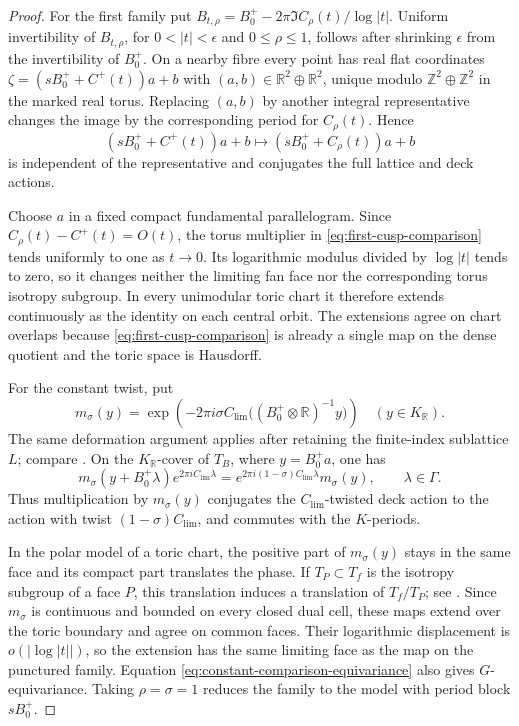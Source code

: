 \begin{proof}
For the first family put
$B_{t,\rho}=B_0^+-2\pi\Im C_\rho(t)/\log|t|$.
Uniform invertibility of $B_{t,\rho}$, for $0<|t|<\epsilon$ and
$0\leq\rho\leq1$, follows after shrinking $\epsilon$ from the
invertibility of $B_0^+$.  On a nearby fibre every point has real flat
coordinates
$
 \zeta=(sB_0^++C^+(t))a+b
$
with $(a,b)\in\mathbb R^2\oplus\mathbb R^2$, unique modulo
$\mathbb Z^2\oplus\mathbb Z^2$ in the marked real torus.  Replacing
$(a,b)$ by another integral representative changes the image by the
corresponding period for $C_\rho(t)$.  Hence
\begin{equation}\label{eq:first-cusp-comparison}
 (sB_0^++C^+(t))a+b\longmapsto
 (sB_0^++C_\rho(t))a+b
\end{equation}
is independent of the representative and conjugates the full lattice and
deck actions.

Choose $a$ in a fixed compact fundamental parallelogram.  Since
$C_\rho(t)-C^+(t)=O(t)$, the torus multiplier in
\eqref{eq:first-cusp-comparison} tends uniformly to one as $t\to0$.  Its
logarithmic modulus divided by $\log|t|$ tends to
zero, so it changes neither the limiting fan face nor the corresponding
torus isotropy subgroup.  In every unimodular toric chart it therefore extends continuously
as the identity on each central orbit.  The extensions agree on chart
overlaps because \eqref{eq:first-cusp-comparison} is already a single map on the
dense quotient and the toric space is Hausdorff.

For the constant twist, put
\[
 m_\sigma(y)=\exp\!\left(
 -2\pi i\sigma C_{\mathrm{lim}}
 \bigl((B_0^+\otimes\mathbb R)^{-1}y\bigr)\right)
 \quad(y\in K_{\mathbb R}).
\]
The same deformation argument applies after retaining the finite-index
sublattice $L$; compare \citep[Lemmas~7.5--7.10]{Alpoge2026}.  On the
$K_{\mathbb R}$-cover of $T_B$, where $y=B_0^+a$, one has
\begin{equation}\label{eq:constant-comparison-equivariance}
 m_\sigma(y+B_0^+\lambda)e^{2\pi iC_{\mathrm{lim}}\lambda}
 =e^{2\pi i(1-\sigma)C_{\mathrm{lim}}\lambda}m_\sigma(y),
 \qquad \lambda\in\Gamma.
\end{equation}
Thus multiplication by $m_\sigma(y)$ conjugates the
$C_{\mathrm{lim}}$-twisted deck action to the action with twist
$(1-\sigma)C_{\mathrm{lim}}$, and commutes with the $K$-periods.

In the polar model of a toric chart, the positive part of $m_\sigma(y)$
stays in the same face and its compact part translates the phase.  If
$T_P\subset T_f$ is the isotropy subgroup of a face $P$, this
translation induces a translation of $T_f/T_P$; see
\citep[Proposition~3.1]{NakayamaOgus2010}.  Since $m_\sigma$ is continuous
and bounded on every closed dual cell, these maps extend over the toric
boundary and agree on common faces.  Their logarithmic displacement is
$o(|\log|t||)$, so the extension has the same limiting face as the
map on the punctured family.  Equation
\eqref{eq:constant-comparison-equivariance} also gives $G$-equivariance.
Taking $\rho=\sigma=1$ reduces the family to the
model with period block $sB_0^+$.
\end{proof}

